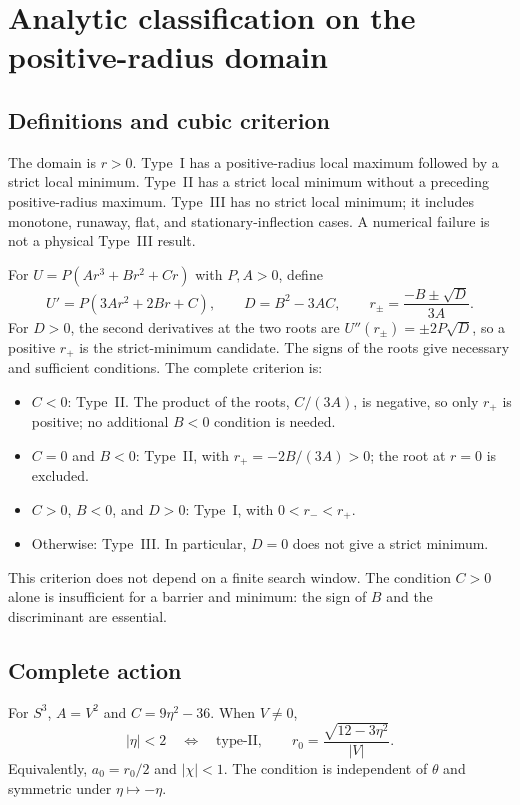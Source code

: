\section{Analytic classification on the positive-radius domain}\label{sec4}
\subsection{Definitions and cubic criterion}
The domain is $r>0$.
Type~I has a positive-radius local maximum followed by a strict local
minimum. Type~II has a strict local minimum without a preceding
positive-radius maximum. Type~III has no strict local minimum;
it includes monotone, runaway, flat, and stationary-inflection cases.
A numerical failure is not a physical Type~III result.

For $U=P(Ar^3+Br^2+Cr)$ with $P,A>0$, define
\begin{equation}
U'=P(3Ar^2+2Br+C),\qquad
D=B^2-3AC,\qquad
r_\pm=\frac{-B\pm\sqrt D}{3A}.
\tag{M4-01}\label{eq:M4-01}
\end{equation}
For $D>0$, the second derivatives at the two roots are
$U''(r_\pm)=\pm2P\sqrt D$, so a positive $r_+$ is the strict-minimum
candidate. The signs of the roots give necessary and sufficient conditions.
The complete criterion is:
\begin{itemize}
\item $C<0$: Type~II. The product of the roots, $C/(3A)$, is negative,
so only $r_+$ is positive; no additional $B<0$ condition is needed.
\item $C=0$ and $B<0$: Type~II, with $r_+=-2B/(3A)>0$;
the root at $r=0$ is excluded.
\item $C>0$, $B<0$, and $D>0$: Type~I, with $0<r_-<r_+$.
\item Otherwise: Type~III. In particular, $D=0$ does not give a strict minimum.
\end{itemize}
This criterion does not depend on a finite search window.
The condition $C>0$ alone is insufficient for a barrier and minimum:
the sign of $B$ and the discriminant are essential.

\subsection{Complete action}
For $S^3$, $A=V^2$ and $C=9\eta^2-36$.
When $V\ne0$,
\begin{equation}
\lvert\eta\rvert<2
\quad\Longleftrightarrow\quad
\text{type-II},\qquad
r_0=\frac{\sqrt{12-3\eta^2}}{\lvert V\rvert}.
\tag{M4-02}\label{eq:M4-02}
\end{equation}
Equivalently, $a_0=r_0/2$ and $|\chi|<1$.
The condition is independent of $\theta$ and symmetric under $\eta\mapsto-\eta$.

